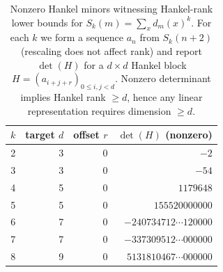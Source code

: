 \begin{table}[H]
\centering
\scriptsize
\setlength{\tabcolsep}{6pt}
\caption{Nonzero Hankel minors witnessing Hankel-rank lower bounds for $S_k(m)=\sum_x d_m(x)^k$. For each $k$ we form a sequence $a_n$ from $S_k(n+2)$ (rescaling does not affect rank) and report $\det(H)$ for a $d\times d$ Hankel block $H=(a_{i+j+r})_{0\le i,j<d}$. Nonzero determinant implies Hankel rank $\ge d$, hence any linear representation requires dimension $\ge d$.}
\label{tab:fold_collision_moment_hankel_rank}
\begin{tabular}{r r r r}
\toprule
$k$ & target $d$ & offset $r$ & $\det(H)$ (nonzero)\\
\midrule
2 & 3 & 0 & $-2$\\
3 & 3 & 0 & $-54$\\
4 & 5 & 0 & $1179648$\\
5 & 5 & 0 & $155520000000$\\
6 & 7 & 0 & $-240734712\cdots120000$\\
7 & 7 & 0 & $-337309512\cdots000000$\\
8 & 9 & 0 & $5131810467\cdots000000$\\
\bottomrule
\end{tabular}
\end{table}
